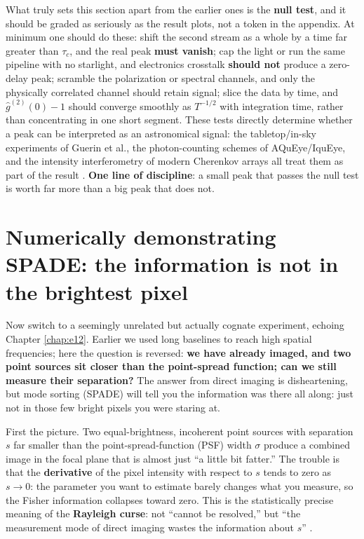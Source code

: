 What truly sets this section apart from the earlier ones is the \textbf{null test}, and it should be graded as seriously as the result plots, not a token in the appendix. At minimum one should do these: shift the second stream as a whole by a time far greater than \(\tau_c\), and the real peak \textbf{must vanish}; cap the light or run the same pipeline with no starlight, and electronics crosstalk \textbf{should not} produce a zero-delay peak; scramble the polarization or spectral channels, and only the physically correlated channel should retain signal; slice the data by time, and \(\hat g^{(2)}(0)-1\) should converge smoothly as \(T^{-1/2}\) with integration time, rather than concentrating in one short segment. These tests directly determine whether a peak can be interpreted as an astronomical signal: the tabletop/in-sky experiments of Guerin et al., the photon-counting schemes of AQuEye/IquEye, and the intensity interferometry of modern Cherenkov arrays all treat them as part of the result \citep{2017MNRAS.472.4126G,2016SPIE.9907E..0NZ,2021MNRAS.506.1585Z,2020NatAs...4.1164A}. \textbf{One line of discipline}: a small peak that passes the null test is worth far more than a big peak that does not.

\section{Numerically demonstrating SPADE: the information is not in the brightest pixel}
\label{sec:e26-spade}

Now switch to a seemingly unrelated but actually cognate experiment, echoing Chapter \ref{chap:e12}. Earlier we used long baselines to reach high spatial frequencies; here the question is reversed: \textbf{we have already imaged, and two point sources sit closer than the point-spread function; can we still measure their separation?} The answer from direct imaging is disheartening, but mode sorting (SPADE) will tell you the information was there all along: just not in those few bright pixels you were staring at.

First the picture. Two equal-brightness, incoherent point sources with separation \(s\) far smaller than the point-spread-function (PSF) width \(\sigma\) produce a combined image in the focal plane that is almost just ``a little bit fatter.'' The trouble is that the \textbf{derivative} of the pixel intensity with respect to \(s\) tends to zero as \(s\to0\): the parameter you want to estimate barely changes what you measure, so the Fisher information collapses toward zero. This is the statistically precise meaning of the \textbf{Rayleigh curse}: not ``cannot be resolved,'' but ``the measurement mode of direct imaging wastes the information about \(s\)'' \citep{2015Optic...2..646T,2016PhRvX...6c1033T}.

